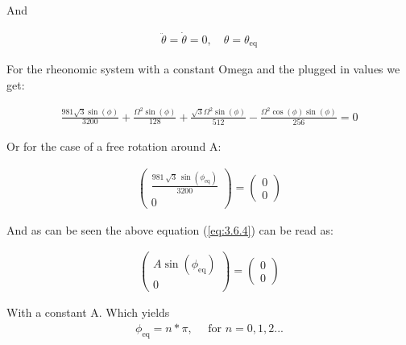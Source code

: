And

\begin{equation}
    \begin{split}
        \ddot \theta = \dot \theta = 0, \quad \theta = \theta_\text{eq}
    \end{split}
\end{equation}

For the rheonomic system with a constant Omega and the plugged in values we get:

\begin{equation}\label{eq:3.6.3}
    \begin{split}
        \frac{981\sqrt{3}\sin\left(\phi \right)}{3200}+\frac{\Omega ^2\sin\left(\phi \right)}{128}+\frac{\sqrt{3}\Omega ^2\sin\left(\phi \right)}{512}-\frac{\Omega ^2\cos\left(\phi \right)\sin\left(\phi \right)}{256} = 0
    \end{split}
\end{equation}

Or for the case of a free rotation around A:

\begin{equation}\label{eq:3.6.4}
    \begin{split}
        \left(\begin{array}{c} \frac{981\,\sqrt{3}\,\sin\left(\phi _{\mathrm{eq}}\right)}{3200}\\ 0 \end{array}\right) = \left(\begin{array}{c}0\\ 0 \end{array}\right)
    \end{split}
\end{equation}

And as can be seen the above equation (\ref{eq:3.6.4}) can be read as:

\begin{equation}\label{eq:3.6.4}
    \begin{split}
        \begin{pmatrix}
            A\sin(\phi_{\text{eq}})\\0
        \end{pmatrix} = \begin{pmatrix}
            0\\0
        \end{pmatrix}
    \end{split}
\end{equation}

With a constant A. Which yields 
\begin{equation}
    \begin{split}
        \phi_{\text{eq}} = n*\pi, \quad \text{ for } n = 0,1,2...
    \end{split}
\end{equation}

